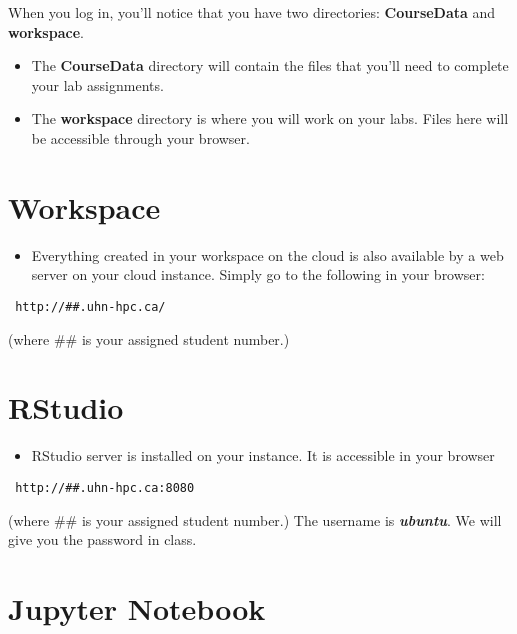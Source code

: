 \documentclass[
]{book}
\providecommand{\tightlist}{%
  \setlength{\itemsep}{0pt}\setlength{\parskip}{0pt}}
\begin{document}
When you log in, you'll notice that you have two directories: \textbf{CourseData} and \textbf{workspace}.

\begin{itemize}
\item
  The \textbf{CourseData} directory will contain the files that you'll need to complete your lab assignments.
\item
  The \textbf{workspace} directory is where you will work on your labs. Files here will be accessible through your browser.
\end{itemize}

\section{Workspace}\label{workspace}

\begin{itemize}
\tightlist
\item
  Everything created in your workspace on the cloud is also available by a web server on your cloud instance. Simply go to the following in your browser:
\end{itemize}

\begin{verbatim}
 http://##.uhn-hpc.ca/
\end{verbatim}

(where \#\# is your assigned student number.)

\section{RStudio}\label{rstudio}

\begin{itemize}
\tightlist
\item
  RStudio server is installed on your instance. It is accessible in your browser
\end{itemize}

\begin{verbatim}
 http://##.uhn-hpc.ca:8080
\end{verbatim}

(where \#\# is your assigned student number.) The username is \textbf{\emph{ubuntu}}. We will give you the password in class.

\section{Jupyter Notebook}\label{jupyter-notebook}
\end{document}
